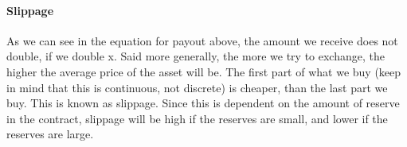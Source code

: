 \paragraph{Slippage}
As we can see in the equation for payout above, the amount we receive does
not double, if we double x. Said more generally, the more we try to exchange,
the higher the average price of the asset will be. The first part of what we buy
(keep in mind that this is continuous, not discrete) is cheaper, than the last
part we buy. This is known as slippage. Since this is dependent on the amount of
reserve in the contract, slippage will be high if the reserves are small, and
lower if the reserves are large.
